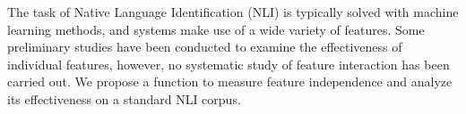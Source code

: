 The task of Native Language Identification (NLI) is typically solved with machine learning methods, and systems make use of a wide variety of features. Some preliminary studies have been conducted to examine the effectiveness of individual features, however, no systematic study of feature interaction has been carried out. We propose a function to measure feature independence and analyze its effectiveness on a standard NLI corpus.
